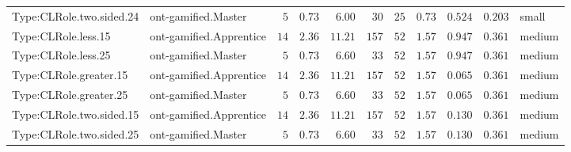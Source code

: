 \documentclass[6pt,a4paper]{article}
\begin{document}
{\begin{longtable}{llrrrrrrrrl}
Type:CLRole.two.sided.24&ont-gamified.Master&$ 5$&$0.73$&$ 6.00$&$ 30$&$ 25$&$ 0.73$&$0.524$&$0.203$&small\tabularnewline
Type:CLRole.less.15&ont-gamified.Apprentice&$14$&$2.36$&$11.21$&$157$&$ 52$&$ 1.57$&$0.947$&$0.361$&medium\tabularnewline
Type:CLRole.less.25&ont-gamified.Master&$ 5$&$0.73$&$ 6.60$&$ 33$&$ 52$&$ 1.57$&$0.947$&$0.361$&medium\tabularnewline
Type:CLRole.greater.15&ont-gamified.Apprentice&$14$&$2.36$&$11.21$&$157$&$ 52$&$ 1.57$&$0.065$&$0.361$&medium\tabularnewline
Type:CLRole.greater.25&ont-gamified.Master&$ 5$&$0.73$&$ 6.60$&$ 33$&$ 52$&$ 1.57$&$0.065$&$0.361$&medium\tabularnewline
\newpage
Type:CLRole.two.sided.15&ont-gamified.Apprentice&$14$&$2.36$&$11.21$&$157$&$ 52$&$ 1.57$&$0.130$&$0.361$&medium\tabularnewline
Type:CLRole.two.sided.25&ont-gamified.Master&$ 5$&$0.73$&$ 6.60$&$ 33$&$ 52$&$ 1.57$&$0.130$&$0.361$&medium\tabularnewline
\hline
\end{longtable}}
\end{document}
